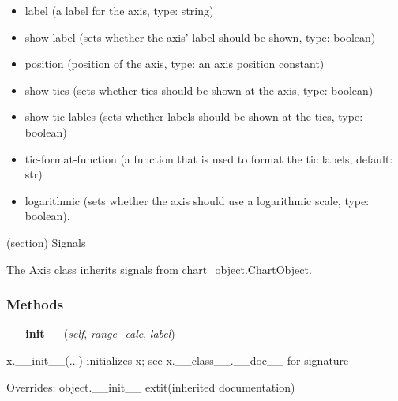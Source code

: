   \begin{itemize}
  \setlength{\parskip}{0.6ex}
    \item label (a label for the axis, type: string)

    \item show-label (sets whether the axis' label should be shown, type: 
      boolean)

    \item position (position of the axis, type: an axis position constant)

    \item show-tics (sets whether tics should be shown at the axis, type: 
      boolean)

    \item show-tic-lables (sets whether labels should be shown at the tics, 
      type: boolean)

    \item tic-format-function (a function that is used to format the tic 
      labels, default: str)

    \item logarithmic (sets whether the axis should use a logarithmic scale, 
      type: boolean).

  \end{itemize}

(section) Signals

  The Axis class inherits signals from chart\_object.ChartObject.



  \subsubsection{Methods}

    \vspace{0.5ex}

\hspace{.8\funcindent}\begin{boxedminipage}{\funcwidth}

    \raggedright \textbf{\_\_init\_\_}(\textit{self}, \textit{range\_calc}, \textit{label})

\setlength{\parskip}{2ex}
    x.\_\_init\_\_(...) initializes x; see x.\_\_class\_\_.\_\_doc\_\_ for 
    signature

\setlength{\parskip}{1ex}
      Overrides: object.\_\_init\_\_ 	extit{(inherited documentation)}

    \end{boxedminipage}

